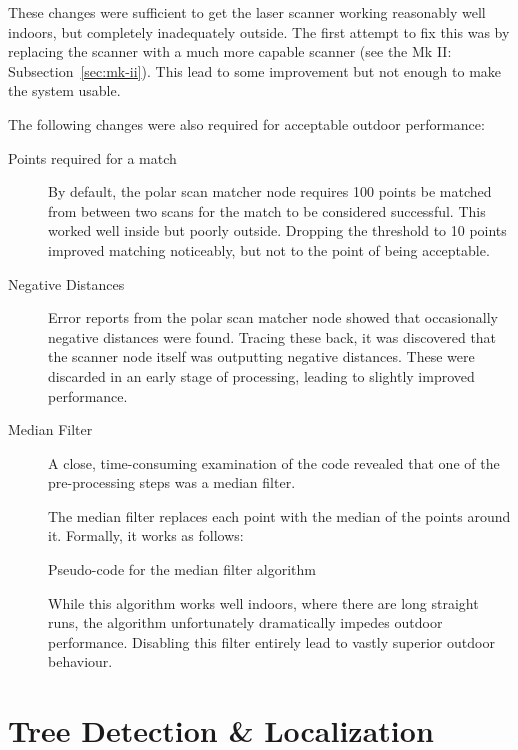 \documentclass[12pt,oneside,a4paper,draft]{book}
\begin{document}
These changes were sufficient to get the laser scanner working
reasonably well indoors, but completely inadequately outside. The
first attempt to fix this was by replacing the scanner with a much
more capable scanner (see the Mk II: Subsection~\ref{sec:mk-ii}). This
lead to some improvement but not enough to make the system usable.

The following changes were also required for acceptable outdoor
performance:

\begin{description}
\item[Points required for a match] By default, the polar scan matcher
  node requires 100 points be matched from between two scans for the
  match to be considered successful. This worked well inside but
  poorly outside. Dropping the threshold to 10
  points improved matching noticeably, but not to the point of being
  acceptable.
\item[Negative Distances] Error reports from the polar scan matcher node
  showed that occasionally negative distances were found. Tracing
  these back, it was discovered that the scanner node itself was
  outputting negative distances. These were discarded in an early
  stage of processing, leading to slightly improved performance.
\item[Median Filter] A close, time-consuming examination of the code
  revealed that one of the pre-processing steps was a median filter.

  The median filter replaces each point with the median of the points
  around it. Formally, it works as follows:
  \IncMargin{1em}
  \begin{algorithm}
    \BlankLine
    \caption{Pseudo-code for the median filter algorithm}
  \end{algorithm}

  While this algorithm works well indoors, where there are long
  straight runs, the algorithm unfortunately dramatically
  impedes outdoor performance. Disabling this filter entirely lead to
  vastly superior outdoor behaviour.
\end{description}


\section{Tree Detection \& Localization}
\label{sec:tree-detection-localization}
\end{document}
